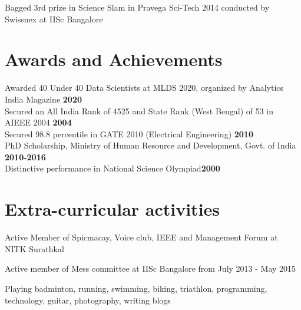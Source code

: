 \documentclass[line]{resume}
\begin{document}
{\begin{resume}
\begin{list2}
				\item Bagged 3rd prize in Science Slam in Pravega Sci-Tech 2014 conducted by Swissnex at IISc Bangalore
				
			\end{list2}
		
	\section{\mysidestyle Awards and Achievements}
	\vspace{1mm}
Awarded 40 Under 40 Data Scientists at MLDS 2020, organized by Analytics India Magazine \hfill \textbf{2020} \vspace{1mm} \\
	Secured an All India Rank of 4525 and State Rank (West Bengal) of 53 in AIEEE 2004 \hfill \textbf{2004} \vspace{1mm}\\%
	Secured  98.8 percentile in GATE 2010 (Electrical Engineering) \hfill \textbf{2010} \vspace{1mm}\\%
	PhD Scholarship, Ministry of Human Resource and Development, Govt. of India \hfill \textbf{2010-2016} \vspace{1mm}\\%
	Distinctive performance in National Science Olympiad\hfill \textbf{2000}                                      
		
	\section{\mysidestyle Extra-curricular activities}
			
			\begin{list2}
			
				\item
				
				
				Active Member of  Spicmacay, Voice club, IEEE and Management Forum
				at NITK Surathkal
				\item Active member of Mess committee at IISc Bangalore from July 2013 - May 2015
				\item
				
				Playing badminton,  running, swimming, biking, triathlon,  programming, technology, guitar,  photography, writing blogs
				

\end{list2}
\end{resume}}
\end{document}
